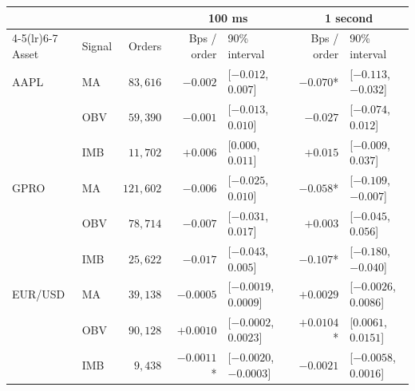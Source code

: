 \begin{tabular}{llrrlrl}
\toprule
 & & & \multicolumn{2}{c}{100 ms} & \multicolumn{2}{c}{1 second} \\
\cmidrule(lr){4-5}\cmidrule(lr){6-7}
Asset & Signal & Orders & Bps / order & 90\% interval & Bps / order & 90\% interval \\
\midrule
AAPL & MA & $83{,}616$ & $-0.002$ & [$-0.012$, $0.007$] & $-0.070$* & [$-0.113$, $-0.032$] \\
 & OBV & $59{,}390$ & $-0.001$ & [$-0.013$, $0.010$] & $-0.027$ & [$-0.074$, $0.012$] \\
 & IMB & $11{,}702$ & $+0.006$ & [$0.000$, $0.011$] & $+0.015$ & [$-0.009$, $0.037$] \\
\midrule
GPRO & MA & $121{,}602$ & $-0.006$ & [$-0.025$, $0.010$] & $-0.058$* & [$-0.109$, $-0.007$] \\
 & OBV & $78{,}714$ & $-0.007$ & [$-0.031$, $0.017$] & $+0.003$ & [$-0.045$, $0.056$] \\
 & IMB & $25{,}622$ & $-0.017$ & [$-0.043$, $0.005$] & $-0.107$* & [$-0.180$, $-0.040$] \\
\midrule
EUR/USD & MA & $39{,}138$ & $-0.0005$ & [$-0.0019$, $0.0009$] & $+0.0029$ & [$-0.0026$, $0.0086$] \\
 & OBV & $90{,}128$ & $+0.0010$ & [$-0.0002$, $0.0023$] & $+0.0104$* & [$0.0061$, $0.0151$] \\
 & IMB & $9{,}438$ & $-0.0011$* & [$-0.0020$, $-0.0003$] & $-0.0021$ & [$-0.0058$, $0.0016$] \\
\bottomrule
\end{tabular}
